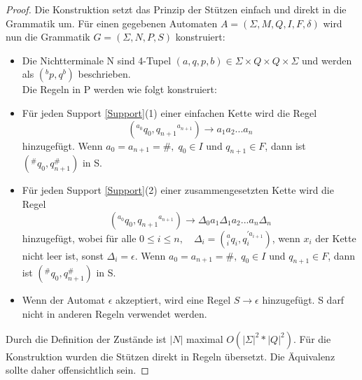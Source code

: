 \begin{proof}
Die Konstruktion setzt das Prinzip der Stützen einfach und direkt in die Grammatik um.
Für einen gegebenen Automaten $A=(\Sigma, M, Q, I, F, \delta)$ wird nun die Grammatik $G=(\Sigma, N, P, S)$ konstruiert:
\begin{itemize}
\item Die Nichtterminale N sind 4-Tupel $(a,q,p,b)\in \Sigma \times Q \times Q \times \Sigma$ und werden als $(^bp,q^b)$ beschrieben. \\
Die Regeln in P werden wie folgt konstruiert:
\item
Für jeden Support \autoref{Support}(1) einer einfachen Kette wird die Regel 
\begin{equation}
(^{a_0} q_0, q_{n+1} \phantom{}^{a_{n+1}})\rightarrow a_1a_2...a_n
\end{equation}
hinzugefügt. Wenn $a_0=a_{n+1}=\#, \; q_0 \in I$ und $q_{n+1} \in F$, dann ist $(^\#q_0,q_{n+1}^\#)$ in S.
\item
Für jeden Support \autoref{Support}(2) einer zusammengesetzten Kette wird die Regel 
\begin{equation}
(^{a_0}q_0, q_{n+1} \phantom{}^{a_{n+1}})\rightarrow \Delta_0a_1\Delta_1a_2...a_n\Delta_n
\end{equation}
hinzugefügt, wobei für alle $0 \leq i \leq n, \quad \Delta_i = (^a_i q_i, q_i^{\prime a_{i+1}})$, wenn $x_i$ der Kette nicht leer ist, sonst $\Delta_i = \epsilon$. Wenn $a_0=a_{n+1}=\#, \; q_0 \in I$ und $q_{n+1} \in F$, dann ist $(^\#q_0,q_{n+1}^\#)$ in S.
\item
Wenn der Automat $\epsilon$ akzeptiert, wird eine Regel $S\rightarrow \epsilon$ hinzugefügt. S darf nicht in anderen Regeln verwendet werden.
\end{itemize}
Durch die Definition der Zustände ist $|N|$ maximal $O(|\Sigma|^2 * |Q|^2)$.
Für die Konstruktion wurden die Stützen direkt in Regeln übersetzt. Die Äquivalenz sollte daher offensichtlich sein.


\end{proof}


